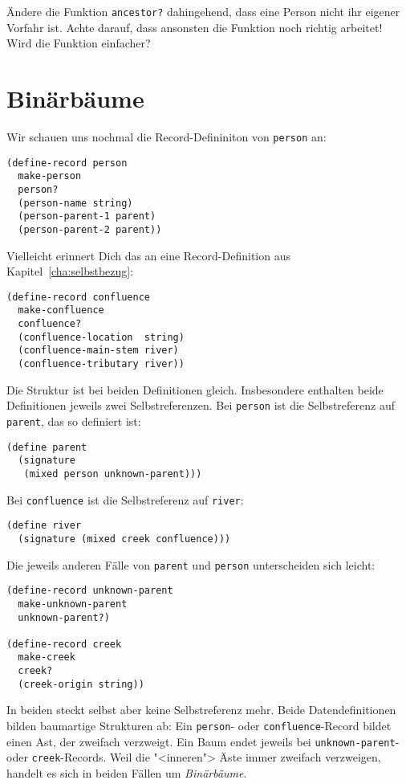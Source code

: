 \begin{aufgabeinline}
  Ändere die Funktion \lstinline{ancestor?} dahingehend, dass eine
  Person nicht ihr eigener Vorfahr ist.
  Achte darauf, dass ansonsten die Funktion noch richtig arbeitet!
  Wird die Funktion einfacher?
\end{aufgabeinline}

\section{Binärbäume}
\label{sec:trees}

%
Wir schauen uns nochmal die Record-Defininiton von \lstinline{person}
an:
%
\begin{lstlisting}
(define-record person
  make-person
  person?
  (person-name string)
  (person-parent-1 parent)
  (person-parent-2 parent))
\end{lstlisting}
%
Vielleicht erinnert Dich das an eine Record-Definition aus
Kapitel~\ref{cha:selbstbezug}:
%
\begin{lstlisting}
(define-record confluence
  make-confluence
  confluence?
  (confluence-location  string)
  (confluence-main-stem river)
  (confluence-tributary river))
\end{lstlisting}
%
Die Struktur ist bei beiden Definitionen gleich.  Insbesondere
enthalten beide Definitionen jeweils zwei Selbstreferenzen.  Bei
\lstinline{person} ist die Selbstreferenz auf \lstinline{parent}, das
so definiert ist:
%
\begin{lstlisting}
(define parent
  (signature
   (mixed person unknown-parent)))
\end{lstlisting}
% 
Bei \lstinline{confluence} ist die Selbstreferenz auf
\lstinline{river}:
%
\begin{lstlisting}
(define river
  (signature (mixed creek confluence)))
\end{lstlisting}
%
Die jeweils anderen Fälle von \lstinline{parent} und
\lstinline{person} unterscheiden sich leicht:
%
\begin{lstlisting}
(define-record unknown-parent
  make-unknown-parent
  unknown-parent?)

(define-record creek
  make-creek
  creek?
  (creek-origin string))
\end{lstlisting}
%
In beiden steckt selbst aber keine Selbstreferenz mehr.  Beide
Datendefinitionen bilden baumartige Strukturen ab: Ein
\lstinline{person}- oder \lstinline{confluence}-Record bildet einen
Ast, der zweifach verzweigt.  Ein Baum endet jeweils bei
\lstinline{unknown-parent}- oder \lstinline{creek}-Records.  Weil die
"<inneren"> Äste immer zweifach verzweigen, handelt es sich in beiden
Fällen um \textit{Binärbäume}.  

